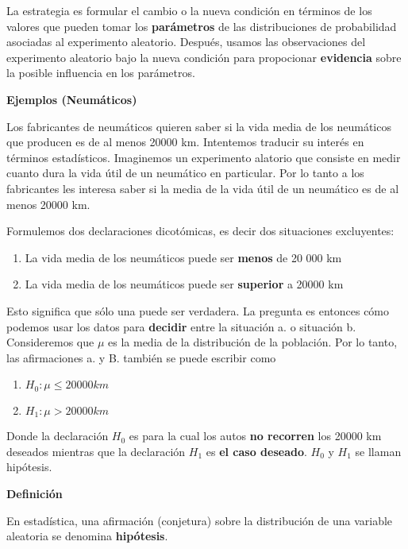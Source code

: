 \documentclass[
]{book}
\providecommand{\tightlist}{%
  \setlength{\itemsep}{0pt}\setlength{\parskip}{0pt}}
\begin{document}
La estrategia es formular el cambio o la nueva condición en términos de los valores que pueden tomar los \textbf{parámetros} de las distribuciones de probabilidad asociadas al experimento aleatorio. Después, usamos las observaciones del experimento aleatorio bajo la nueva condición para propocionar \textbf{evidencia} sobre la posible influencia en los parámetros.

\textbf{Ejemplos (Neumáticos)}

Los fabricantes de neumáticos quieren saber si la vida media de los neumáticos que producen es de al menos 20000 km. Intentemos traducir su interés en términos estadísticos. Imaginemos un experimento alatorio que consiste en medir cuanto dura la vida útil de un neumático en particular. Por lo tanto a los fabricantes les interesa saber si la media de la vida útil de un neumático es de al menos 20000 km.

\newpage

Formulemos dos declaraciones dicotómicas, es decir dos situaciones excluyentes:

\begin{enumerate}
\def\labelenumi{\alph{enumi}.}
\tightlist
\item
  La vida media de los neumáticos puede ser \textbf{menos} de 20 000 km
\item
  La vida media de los neumáticos puede ser \textbf{superior} a 20000 km
\end{enumerate}

Esto significa que sólo una puede ser verdadera. La pregunta es entonces cómo podemos usar los datos para \textbf{decidir} entre la situación a. o situación b. Consideremos que \(\mu\) es la media de la distribución de la población. Por lo tanto, las afirmaciones a. y B. también se puede escribir como

\begin{enumerate}
\def\labelenumi{\alph{enumi}.}
\tightlist
\item
  \(H_0: \mu \leq 20000km\)
\item
  \(H_1: \mu > 20000km\)
\end{enumerate}

Donde la declaración \(H_0\) es para la cual los autos \textbf{no recorren} los 20000 km deseados mientras que la declaración \(H_1\) es \textbf{el caso deseado}. \(H_0\) y \(H_1\) se llaman hipótesis.

\textbf{Definición}

En estadística, una afirmación (conjetura) sobre la distribución de una variable aleatoria se denomina \textbf{hipótesis}.
\end{document}
